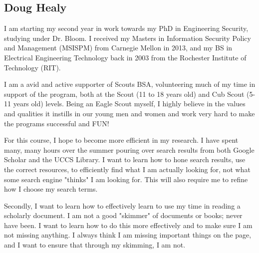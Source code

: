 \subsection{Doug Healy}

I am starting my second year in work towards my PhD in Engineering Security, studying under Dr. Bloom. I received my Masters in Information Security Policy and Management (MSISPM) from Carnegie Mellon in 2013, and my BS in Electrical Engineering Technology back in 2003 from the Rochester Institute of Technology (RIT). 

I am a avid and active supporter of Scouts BSA, volunteering much of my time in support of the program, both at the Scout (11 to 18 years old) and Cub Scout (5-11 years old) levels. Being an Eagle Scout myself, I highly believe in the values and qualities it instills in our young men and women and work very hard to make the programs successful and FUN!  

For this course, I hope to become more efficient in my research. I have spent many, many hours over the summer pouring over search results from both Google Scholar and the UCCS Library. I want to learn how to hone search results, use the correct resources, to efficiently find what I am actually looking for, not what some search engine "thinks" I am looking for. This will also require me to refine how I choose my search terms.  

Secondly, I want to learn how to effectively learn to use my time in reading a scholarly document. I am not a good "skimmer" of documents or books; never have been. I want to learn how to do this more effectively and to make sure I am not missing anything. I always think I am missing important things on the page, and I want to ensure that through my skimming, I am not.   

